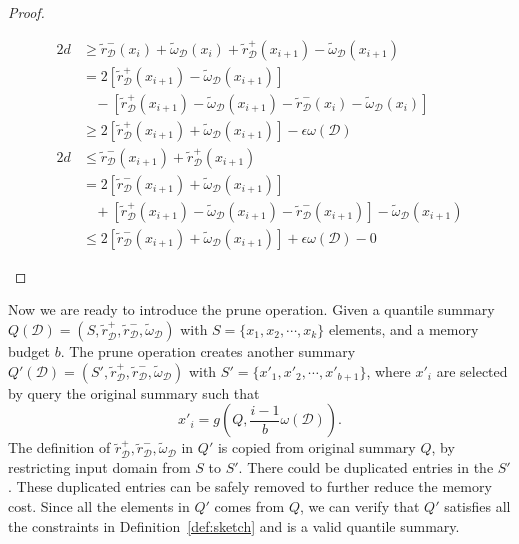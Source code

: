 \documentclass{sig-alternate-05-2015}
\newcommand{\eps}{\epsilon}
\newcommand{\w}{\omega}
\newcommand{\sD}{\mathcal{D}}
\newcommand{\tdr}{\tilde{r}_{\sD}}
\newcommand{\tdw}{\tilde{\omega}_{\sD}}
\begin{document}
\begin{proof}
\begin{itemize}
\begin{equation*}
\begin{split}
2 d  &\geq  \tdr^-(x_i) + \tdw(x_i) + \tdr^+(x_{i+1}) - \tdw(x_{i+1})\\
&= 2[\tdr^+(x_{i+1}) - \tdw(x_{i+1})] \\
& \ \ \ \ -  [\tdr^+(x_{i+1}) - \tdw(x_{i+1}) - \tdr^-(x_i) - \tdw(x_i)]\\
&\geq 2[\tdr^+(x_{i+1}) + \tdw(x_{i+1})] - \eps \w(\sD)\\
 2 d & \leq \tdr^-(x_{i+1}) + \tdr^+(x_{i+1})\\
 & = 2[ \tdr^-(x_{i+1}) + \tdw(x_{i+1})] \\
 & \ \ \ \ + [\tdr^+(x_{i+1}) - \tdw(x_{i+1}) - \tdr^-(x_{i+1}) ] - \tdw(x_{i+1})\\
 &\leq 2[ \tdr^-(x_{i+1}) + \tdw(x_{i+1})]  + \eps \w(\sD) - 0
\end{split}
\end{equation*}
\end{itemize}
\end{proof}
Now we are ready to introduce the prune operation. Given a quantile summary $Q(\sD) = (S, \tdr^+, \tdr^-, \tdw)$ with $S=\{x_1,x_2,\cdots, x_k\}$ elements, and a memory budget $b$. The prune operation creates another summary $Q'(\sD) = (S', \tdr^+, \tdr^-, \tdw)$ with $S' =\{x'_1,x'_2, \cdots, x'_{b+1}\}$, where $x'_{i}$ are selected by query the original summary such that
$$ x'_{i} = g\left(Q, \frac{i-1}{b}\w(\sD)\right).$$
The definition of $\tdr^+, \tdr^-, \tdw$ in $Q'$ is copied from original summary $Q$, by restricting input domain from $S$ to $S'$.
There could be duplicated entries in the $S'$. These duplicated entries can be safely removed to further reduce the memory cost.
Since all the elements in $Q'$ comes from $Q$, we can verify that $Q'$ satisfies all the constraints in Definition~\ref{def:sketch} and is a valid quantile summary.
\end{document}
